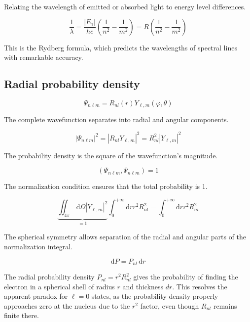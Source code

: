 \documentclass[italian]{HKNdocument}
\begin{document}
Relating the wavelength of emitted or absorbed light to energy level differences.

\begin{equation}
\frac{1}{\lambda}=\frac{\left|E_{1}\right|}{h c}\left(\frac{1}{n^{2}}-\frac{1}{m^{2}}\right)=R\left(\frac{1}{n^{2}}-\frac{1}{m^{2}}\right) \label{eq:9.94}
\end{equation}

This is the Rydberg formula, which predicts the wavelengths of spectral lines with remarkable accuracy.

\subsection{Radial probability density}

\begin{equation}
\Psi_{n \ell m}=R_{n l}(r) Y_{\ell, m}(\varphi, \theta) \label{eq:9.95}
\end{equation}

The complete wavefunction separates into radial and angular components.

\begin{equation}
\left|\Psi_{n \ell m}\right|^{2}=\left|R_{n l} Y_{\ell, m}\right|^{2}=R_{n l}^{2}\left|Y_{\ell, m}\right|^{2} \label{eq:9.96}
\end{equation}

The probability density is the square of the wavefunction's magnitude.

\begin{equation}
\left(\Psi_{n \ell m}, \Psi_{n \ell m}\right)=1 \label{eq:9.97}
\end{equation}

The normalization condition ensures that the total probability is 1.

\begin{equation}
\underbrace{\iint_{4 \pi} \, \mathrm{d} \Omega\left|Y_{\ell, m}\right|^{2}}_{=1} \int_{0}^{+\infty} \mathrm{d} r r^{2} R_{n l}^{2}=\int_{0}^{+\infty} \mathrm{d} r r^{2} R_{n l}^{2} \label{eq:9.98}
\end{equation}

The spherical symmetry allows separation of the radial and angular parts of the normalization integral.

\begin{equation}
\mathrm{d} P=P_{n l} \, \mathrm{d} r \label{eq:9.99}
\end{equation}

The radial probability density $P_{nl} = r^2 R_{nl}^2$ gives the probability of finding the electron in a spherical shell of radius $r$ and thickness $dr$. This resolves the apparent paradox for $\ell=0$ states, as the probability density properly approaches zero at the nucleus due to the $r^2$ factor, even though $R_{nl}$ remains finite there.
\end{document}
